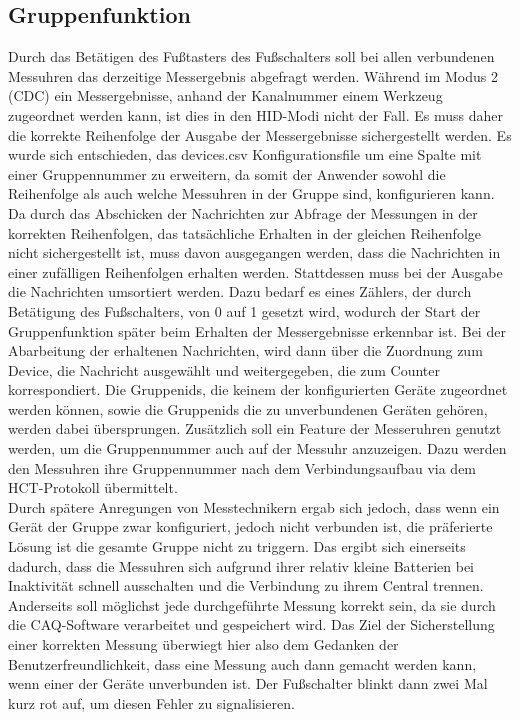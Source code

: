 \subsection{Gruppenfunktion}
Durch das Betätigen des Fußtasters des Fußschalters soll bei allen verbundenen Messuhren das derzeitige Messergebnis abgefragt werden. Während im Modus 2 (CDC) ein Messergebnisse, anhand der Kanalnummer einem Werkzeug zugeordnet werden kann, ist dies in den \ac{HID}-Modi nicht der Fall. Es muss daher die korrekte Reihenfolge der Ausgabe der Messergebnisse sichergestellt werden. Es wurde sich entschieden, das devices.csv Konfigurationsfile um eine Spalte mit einer Gruppennummer zu erweitern, da somit der Anwender sowohl die Reihenfolge als auch welche Messuhren in der Gruppe sind, konfigurieren kann. Da durch das Abschicken der Nachrichten zur Abfrage der Messungen in der korrekten Reihenfolgen, das tatsächliche Erhalten in der gleichen Reihenfolge nicht sichergestellt ist, muss davon ausgegangen werden, dass die Nachrichten in einer zufälligen Reihenfolgen erhalten werden. Stattdessen muss bei der Ausgabe die Nachrichten umsortiert werden. Dazu bedarf es eines Zählers, der durch Betätigung des Fußschalters, von 0 auf 1 gesetzt wird, wodurch der Start der Gruppenfunktion später beim Erhalten der Messergebnisse erkennbar ist. Bei der Abarbeitung der erhaltenen Nachrichten, wird dann über die Zuordnung zum Device, die Nachricht ausgewählt und weitergegeben, die zum Counter korrespondiert. Die Gruppenids, die keinem der konfigurierten Geräte zugeordnet werden können, sowie die Gruppenids die zu unverbundenen Geräten gehören, werden dabei übersprungen. Zusätzlich soll ein Feature der Messeruhren genutzt werden, um die Gruppennummer auch auf der Messuhr anzuzeigen. Dazu werden den Messuhren ihre Gruppennummer nach dem Verbindungsaufbau via dem \ac{HCT}-Protokoll übermittelt.\\
Durch spätere Anregungen von Messtechnikern ergab sich jedoch, dass wenn ein Gerät der Gruppe zwar konfiguriert, jedoch nicht verbunden ist, die präferierte Lösung ist die gesamte Gruppe nicht zu triggern. Das ergibt sich einerseits dadurch, dass die Messuhren sich aufgrund ihrer relativ kleine Batterien bei Inaktivität schnell ausschalten und die Verbindung zu ihrem Central trennen. Anderseits soll möglichst jede durchgeführte Messung korrekt sein, da sie durch die \ac{CAQ}-Software verarbeitet und gespeichert wird. Das Ziel der Sicherstellung einer korrekten Messung überwiegt hier also dem Gedanken der Benutzerfreundlichkeit, dass eine Messung auch dann gemacht werden kann, wenn einer der Geräte unverbunden ist. Der Fußschalter blinkt dann zwei Mal kurz rot auf, um diesen Fehler zu signalisieren.\\
